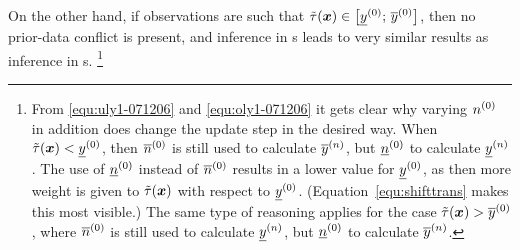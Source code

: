 On the other hand, if observations are such that
$\tilde{\tau}({\bm x}) \in \left[\underline{y}^{(0)};\,\overline{y}^{(0)}\right]$, then
no prior-data conflict is present, and inference in \nymodel s
leads to very similar results as inference in \ymodel s.%
\footnote{From \eqref{equ:uly1-071206} and \eqref{equ:oly1-071206}
it gets clear why varying $n^{(0)}$ in addition does change the
update step in the desired way. When $\tilde{\tau}({\bm x}) < \underline{y}^{(0)}$,
then $\overline{n}^{(0)}$ is still used to calculate $\overline{y}^{(n)}$, but
$\underline{n}^{(0)}$ to calculate $\underline{y}^{(n)}$. The use of $\underline{n}^{(0)}$ instead
of $\overline{n}^{(0)}$ results in a lower value for $\underline{y}^{(0)}$, as then
more weight is given to $\tilde{\tau}({\bm x})$ with respect to
$\underline{y}^{(0)}$. (Equation~\eqref{equ:shifttrans} makes this most
visible.) The same type of reasoning applies for the case
$\tilde{\tau}({\bm x}) > \overline{y}^{(0)}$, where $\overline{n}^{(0)}$ is still used to
calculate $\underline{y}^{(n)}$, but $\underline{n}^{(0)}$ to calculate $\overline{y}^{(n)}$.}

